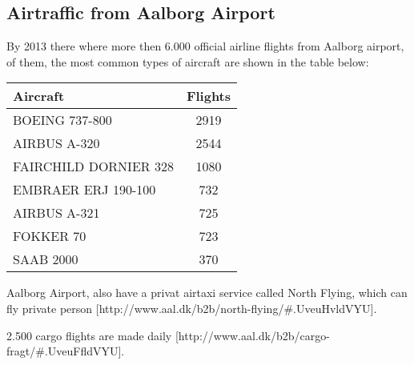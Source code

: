 \subsection{Airtraffic from Aalborg Airport}

By 2013 there where more then 6.000 official airline flights from Aalborg airport, of them, the most common types of aircraft are shown in the table below:

\begin{center}
    \begin{tabular}{ | l | c | }
        \hline
        Aircraft & Flights\\ \hline
        BOEING 737-800 & 2919\\ \hline
        AIRBUS A-320 & 2544\\ \hline
        FAIRCHILD DORNIER 328 & 1080\\ \hline
        EMBRAER ERJ 190-100 & 732\\ \hline
        AIRBUS A-321 & 725\\ \hline
        FOKKER 70 & 723\\ \hline
        SAAB 2000 & 370\\ \hline
    \end{tabular}
\end{center}


Aalborg Airport, also have a privat airtaxi service called North Flying, which can fly private person [http://www.aal.dk/b2b/north-flying/\#.UveuHvldVYU].

2.500 cargo flights are made daily [http://www.aal.dk/b2b/cargo-fragt/\#.UveuFfldVYU].


